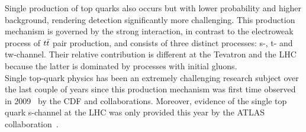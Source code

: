 Single production of top quarks also occurs but with lower probability and higher background, rendering detection significantly more challenging.
This production mechanism is governed by the strong interaction, in contrast to the electroweak process of $t\bar{t}$ pair production, and consists of three distinct processes: s-, t- and tw-channel.
Their relative contribution is different at the Tevatron and the LHC because the latter is dominated by processes with initial gluons. %
\\
Single top-quark physics has been an extremely challenging research subject over the last couple of years since this production mechanism was first time observed in 2009~\cite{STDiscovery1, STDiscovery2} by the CDF and \DZ collaborations. Moreover, evidence of the single top quark s-channel at the LHC was only provided this year by the ATLAS collaboration~\cite{AtlasSTsChEvidence}.
